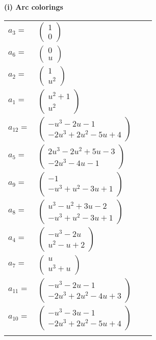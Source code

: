 \documentclass[1p]{elsarticle_modified}
\theoremstyle{definition}
\begin{document}
\flushleft \textbf{(i) Arc colorings}\\
\begin{tabular}{m{7pt} m{180pt} m{7pt} m{180pt} }
\flushright $a_{3}=$&$\begin{pmatrix}1\\0\end{pmatrix}$ \\
\flushright $a_{6}=$&$\begin{pmatrix}0\\u\end{pmatrix}$ \\
\flushright $a_{2}=$&$\begin{pmatrix}1\\u^2\end{pmatrix}$ \\
\flushright $a_{1}=$&$\begin{pmatrix}u^2+1\\u^2\end{pmatrix}$ \\
\flushright $a_{12}=$&$\begin{pmatrix}- u^3-2 u-1\\-2 u^3+2 u^2-5 u+4\end{pmatrix}$ \\
\flushright $a_{5}=$&$\begin{pmatrix}2 u^3-2 u^2+5 u-3\\-2 u^3-4 u-1\end{pmatrix}$ \\
\flushright $a_{9}=$&$\begin{pmatrix}-1\\- u^3+u^2-3 u+1\end{pmatrix}$ \\
\flushright $a_{8}=$&$\begin{pmatrix}u^3- u^2+3 u-2\\- u^3+u^2-3 u+1\end{pmatrix}$ \\
\flushright $a_{4}=$&$\begin{pmatrix}- u^3-2 u\\u^2- u+2\end{pmatrix}$ \\
\flushright $a_{7}=$&$\begin{pmatrix}u\\u^3+u\end{pmatrix}$ \\
\flushright $a_{11}=$&$\begin{pmatrix}- u^3-2 u-1\\-2 u^3+2 u^2-4 u+3\end{pmatrix}$ \\
\flushright $a_{10}=$&$\begin{pmatrix}- u^3-3 u-1\\-2 u^3+2 u^2-5 u+4\end{pmatrix}$\\&\end{tabular}
\end{document}
